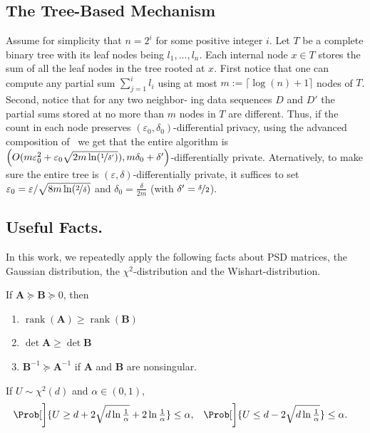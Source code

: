 \documentclass{article}
\renewcommand{\vec}[1]{\bm{#1}}
\newcommand{\inv}[1]{#1^{-1}}
\newcommand{\rank}{\operatorname{rank}}
\renewcommand{\det}{\operatorname{det}}
\begin{document}
\subsection{The Tree-Based Mechanism}

Assume for simplicity that $n=2^i$ for some positive integer $i$. Let $T$ be a complete binary tree with its leaf nodes being $l_1,...,l_n$. Each internal
node $x\in T$ stores the sum of all the leaf nodes in the tree
rooted at $x$. First notice that one can compute any partial sum $\sum_{j=1}^i l_i$ using at most $m:=\lceil\log(n)+1\rceil$ nodes of $T$. Second, notice that for any two neighbor-
ing data sequences $D$ and $D'$ the partial sums stored at no more than $m$ nodes in $T$ are different. Thus, if the count in each node preserves $(\varepsilon_0,\delta_0)$-differential privacy, using the advanced composition of~\cite{DworkBoosting2010} we get that the entire algorithm is $\left(O(m\varepsilon_0^2+\varepsilon_0\sqrt{2m\ln(\nicefrac 1{\delta'})}), m\delta_0 + \delta'\right)$-differentially private. Aternatively, to make sure the entire tree is $(\varepsilon,\delta)$-differentially private, it suffices to set $\varepsilon_0 = \varepsilon / \sqrt{8m\ln(\nicefrac 2 \delta)}$ and $\delta_0= \tfrac \delta{2m}$ (with $\delta'=\nicefrac \delta 2$).

\subsection{Useful Facts.}
\label{apx_subsec:facts}

In this work, we repeatedly apply the following facts about PSD matrices, the Gaussian distribution, the $\chi^2$-distribution and the Wishart-distribution.

\begin{claim}%
  \label{claim:psd-matrix-props}%
  If $\vec A \succeq \vec B \succeq 0$, then
  \begin{enumerate}[nolistsep]
  \item $\rank(\vec A) \ge \rank(\vec B)$
  \item $\det \vec A \ge \det \vec B$
  \item $\inv{\vec B} \succeq \inv{\vec A}$ if $\vec A$ and $\vec B$ are nonsingular.
  \end{enumerate}
\end{claim}

\begin{claim}%
  \label{claim:chi2-tails}
  If $U\sim\chi^2(d)$ and $\alpha\in(0,1)$,
  \begin{align*}
    \Prob[\bigg]{U \ge d + 2\sqrt{d\ln\tfrac{1}{\alpha}} + 2\ln\tfrac{1}{\alpha}} &\le \alpha,
    & \Prob[\bigg]{U \le d - 2\sqrt{d\ln\tfrac{1}{\alpha}}} &\le \alpha.
  \end{align*}
\end{claim}
\end{document}
